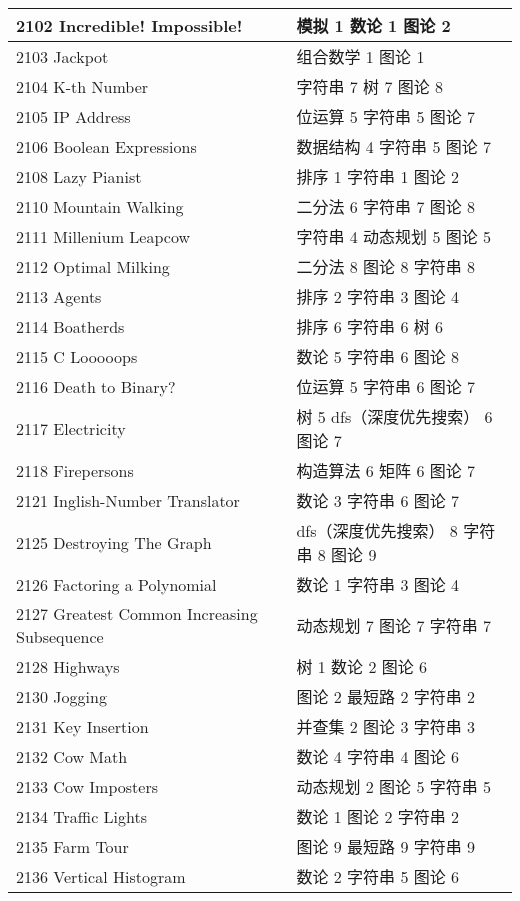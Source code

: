 \begin{longtable}{| p{} | p{} |}
 2102 Incredible! Impossible!  & 模拟 1 数论 1 图论 2 \\ \hline
 2103 Jackpot  & 组合数学 1 图论 1 \\ \hline
 2104 K-th Number  & 字符串 7 树 7 图论 8 \\ \hline
 2105 IP Address  & 位运算 5 字符串 5 图论 7 \\ \hline
 2106 Boolean Expressions  & 数据结构 4 字符串 5 图论 7 \\ \hline
 2108 Lazy Pianist  & 排序 1 字符串 1 图论 2 \\ \hline
 2110 Mountain Walking  & 二分法 6 字符串 7 图论 8 \\ \hline
 2111 Millenium Leapcow  & 字符串 4 动态规划 5 图论 5 \\ \hline
 2112 Optimal Milking  & 二分法 8 图论 8 字符串 8 \\ \hline
 2113 Agents  & 排序 2 字符串 3 图论 4 \\ \hline
 2114 Boatherds  & 排序 6 字符串 6 树 6 \\ \hline
 2115 C Looooops  & 数论 5 字符串 6 图论 8 \\ \hline
 2116 Death to Binary?  & 位运算 5 字符串 6 图论 7 \\ \hline
 2117 Electricity  & 树 5 dfs（深度优先搜索） 6 图论 7 \\ \hline
 2118 Firepersons  & 构造算法 6 矩阵 6 图论 7 \\ \hline
 2121 Inglish-Number Translator  & 数论 3 字符串 6 图论 7 \\ \hline
 2125 Destroying The Graph  & dfs（深度优先搜索） 8 字符串 8 图论 9 \\ \hline
 2126 Factoring a Polynomial  & 数论 1 字符串 3 图论 4 \\ \hline
 2127 Greatest Common Increasing Subsequence  & 动态规划 7 图论 7 字符串 7 \\ \hline
 2128 Highways  & 树 1 数论 2 图论 6 \\ \hline
 2130 Jogging  & 图论 2 最短路 2 字符串 2 \\ \hline
 2131 Key Insertion  & 并查集 2 图论 3 字符串 3 \\ \hline
 2132 Cow Math  & 数论 4 字符串 4 图论 6 \\ \hline
 2133 Cow Imposters  & 动态规划 2 图论 5 字符串 5 \\ \hline
 2134 Traffic Lights  & 数论 1 图论 2 字符串 2 \\ \hline
 2135 Farm Tour  & 图论 9 最短路 9 字符串 9 \\ \hline
 2136 Vertical Histogram  & 数论 2 字符串 5 图论 6 \\ \hline

\end{longtable}
